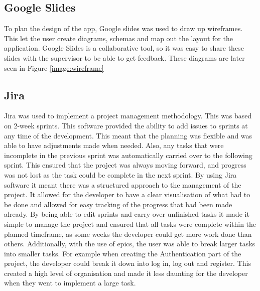 \subsection{Google Slides}

To plan the design of the app, Google slides was used to draw up wireframes. This let the user create diagrams, schemas and map out the layout for the application. Google Slides is a collaborative tool, so it was easy to share these slides with the supervisor to be able to get feedback. These diagrams are later seen in Figure \ref{image:wireframe}

\subsection{Jira}
Jira was used to implement a project management methodology. This was based on 2-week sprints. This software provided the ability to add issues to sprints at any time of the development. This meant that the planning was flexible and was able to have adjustments made when needed. Also, any tasks that were incomplete in the previous sprint was automatically carried over to the following sprint. This ensured that the project was always moving forward, and progress was not lost as the task could be complete in the next sprint. By using Jira software it meant there was a structured approach to the management of the project. It allowed for the developer to have a clear visualisation of what had to be done and allowed for easy tracking of the progress that had been made already. By being able to edit sprints and carry over unfinished tasks it made it simple to manage the project and ensured that all tasks were complete within the planned timeframe, as some weeks the developer could get more work done than others. 
\newline \newline
Additionally, with the use of epics, the user was able to break larger tasks into smaller tasks. For example when creating the Authentication part of the project, the developer could break it down into log in, log out and register. This created a high level of organisation and made it less daunting for the developer when they went to implement a large task.




